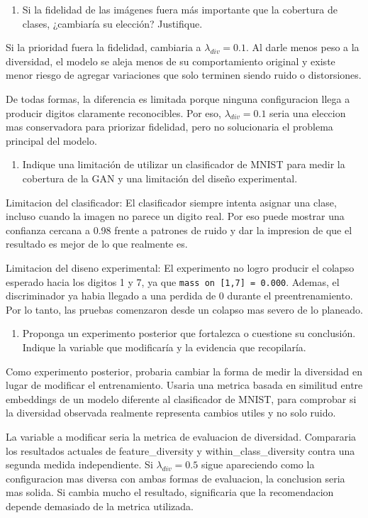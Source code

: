 \documentclass[11pt,letterpaper]{article}
\newenvironment{responsebox}{\begin{tcolorbox}[colframe=black!50]}{\end{tcolorbox}}
\begin{document}
\begin{enumerate}[resume]
  \item Si la fidelidad de las imágenes fuera más importante que la cobertura
  de clases, ¿cambiaría su elección? Justifique.
\end{enumerate}
\begin{responsebox}
Si la prioridad fuera la fidelidad, cambiaria a $\lambda_{div}=0.1$. Al darle menos peso a la diversidad, el modelo se aleja menos de su comportamiento original y existe menor riesgo de agregar variaciones que solo terminen siendo ruido o distorsiones.

De todas formas, la diferencia es limitada porque ninguna configuracion llega a producir digitos claramente reconocibles. Por eso, $\lambda_{div}=0.1$ seria una eleccion mas conservadora para priorizar fidelidad, pero no solucionaria el problema principal del modelo.
\end{responsebox}


\begin{enumerate}[resume]
  \item Indique una limitación de utilizar un clasificador de MNIST para medir
  la cobertura de la GAN y una limitación del diseño experimental.
\end{enumerate}
\begin{responsebox}
Limitacion del clasificador: El clasificador siempre intenta asignar una clase, incluso cuando la imagen no parece un digito real. Por eso puede mostrar una confianza cercana a 0.98 frente a patrones de ruido y dar la impresion de que el resultado es mejor de lo que realmente es.

Limitacion del diseno experimental: El experimento no logro producir el colapso esperado hacia los digitos 1 y 7, ya que \texttt{mass on [1,7] = 0.000}. Ademas, el discriminador ya habia llegado a una perdida de 0 durante el preentrenamiento. Por lo tanto, las pruebas comenzaron desde un colapso mas severo de lo planeado.
\end{responsebox}

\begin{enumerate}[resume]
  \item Proponga un experimento posterior que fortalezca o cuestione su
  conclusión. Indique la variable que modificaría y la evidencia que recopilaría.
\end{enumerate}
\begin{responsebox}
Como experimento posterior, probaria cambiar la forma de medir la diversidad en lugar de modificar el entrenamiento. Usaria una metrica basada en similitud entre embeddings de un modelo diferente al clasificador de MNIST, para comprobar si la diversidad observada realmente representa cambios utiles y no solo ruido.

La variable a modificar seria la metrica de evaluacion de diversidad. Compararia los resultados actuales de feature_diversity y within_class\_diversity contra una segunda medida independiente. Si $\lambda_{div}=0.5$ sigue apareciendo como la configuracion mas diversa con ambas formas de evaluacion, la conclusion seria mas solida. Si cambia mucho el resultado, significaria que la recomendacion depende demasiado de la metrica utilizada.
\end{responsebox}
\end{document}
